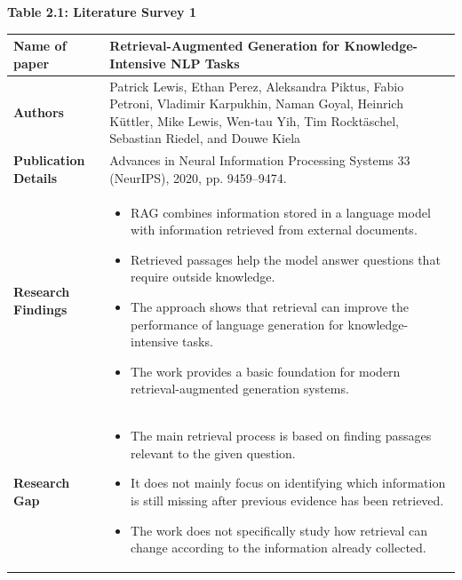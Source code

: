 \documentclass[12pt,a4paper]{report}
\begin{document}
\begin{center}\textbf{Table 2.1: Literature Survey 1}\end{center}
\begin{longtable}{|p{1.25in}|p{5.15in}|}
\hline
\textbf{Name of paper} & Retrieval-Augmented Generation for Knowledge-Intensive NLP Tasks \cite{lewis2020rag} \\ \hline

\textbf{Authors} & Patrick Lewis, Ethan Perez, Aleksandra Piktus, Fabio Petroni, Vladimir Karpukhin, Naman Goyal, Heinrich K\"uttler, Mike Lewis, Wen-tau Yih, Tim Rockt\"aschel, Sebastian Riedel, and Douwe Kiela \\ \hline

\textbf{Publication Details} & Advances in Neural Information Processing Systems 33 (NeurIPS), 2020, pp. 9459--9474. \\ \hline

\textbf{Research Findings} &
\begin{itemize}[leftmargin=0.18in,itemsep=0.05in,topsep=0pt,parsep=0pt]
\item RAG combines information stored in a language model with information retrieved from external documents.
\item Retrieved passages help the model answer questions that require outside knowledge.
\item The approach shows that retrieval can improve the performance of language generation for knowledge-intensive tasks.
\item The work provides a basic foundation for modern retrieval-augmented generation systems.
\end{itemize} \\ \hline

\textbf{Research Gap} &
\begin{itemize}[leftmargin=0.18in,itemsep=0.05in,topsep=0pt,parsep=0pt]
\item The main retrieval process is based on finding passages relevant to the given question.
\item It does not mainly focus on identifying which information is still missing after previous evidence has been retrieved.
\item The work does not specifically study how retrieval can change according to the information already collected.
\end{itemize} \\ \hline


\end{longtable}
\end{document}
